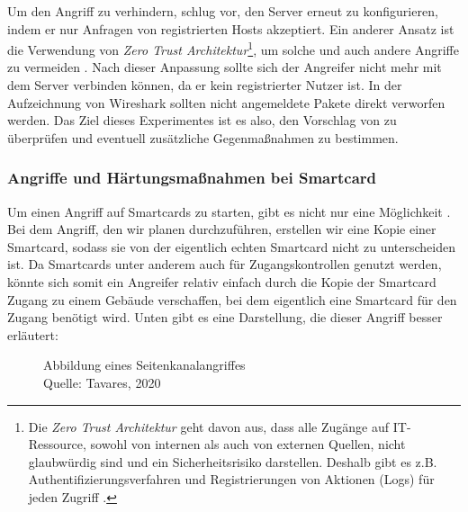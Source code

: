 Um den Angriff zu verhindern, schlug \cite{refip:NYRS} vor, den Server erneut zu konfigurieren, indem er nur Anfragen von
registrierten Hosts akzeptiert. Ein anderer Ansatz ist die Verwendung von \textit{Zero Trust Architektur}\footnote{Die 
\textit{Zero Trust Architektur} geht davon aus, dass alle Zugänge auf IT-Ressource, sowohl von internen als auch von
externen Quellen, nicht glaubwürdig sind und ein Sicherheitsrisiko darstellen. Deshalb gibt es z.B. Authentifizierungsverfahren
und Registrierungen von Aktionen (Logs) für jeden Zugriff \cite{refart:EBZT}.}, um solche und auch andere Angriffe 
zu vermeiden \cite{refip:LYSP}.  Nach dieser Anpassung sollte sich der Angreifer nicht mehr mit dem Server
verbinden können, da er kein registrierter Nutzer ist. In der Aufzeichnung von Wireshark sollten nicht angemeldete Pakete direkt
verworfen werden.
Das Ziel dieses Experimentes ist es also, den Vorschlag von \cite{refip:NYRS} zu überprüfen und eventuell zusätzliche Gegenmaßnahmen zu bestimmen.


\subsubsection{Angriffe und Härtungsmaßnahmen bei Smartcard}
Um einen Angriff auf Smartcards zu starten, gibt es nicht nur eine Möglichkeit \cite{refart:TKSK}. Bei dem Angriff, den wir planen 
durchzuführen, erstellen wir eine Kopie einer Smartcard, sodass sie von der eigentlich echten Smartcard nicht zu unterscheiden ist.
Da Smartcards unter anderem auch für Zugangskontrollen genutzt werden, könnte sich somit ein Angreifer relativ einfach durch 
die Kopie der Smartcard Zugang zu einem Gebäude verschaffen, bei dem eigentlich eine Smartcard für den Zugang benötigt wird.
Unten gibt es eine Darstellung, die dieser Angriff besser erläutert:


\begin{figure}[H]
  \caption{Abbildung eines Seitenkanalangriffes\\ Quelle: Tavares, 2020}
  \label{fig:refart_scpt}
\end{figure}


